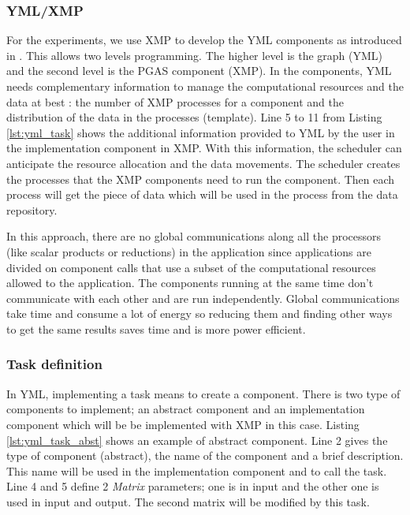 \subsubsection{YML/XMP}
For the experiments, we use XMP to develop the YML components as introduced in \cite{TsSHP2013}.
This allows two levels programming.
The higher level is the graph (YML) and the second level is the PGAS component (XMP).
In the components, YML needs complementary information to manage the computational resources and the data at best : the number of XMP processes for a component and the distribution of the data in the processes (template).
Line 5 to 11 from Listing \ref{lst:yml_task} shows the additional information provided to YML by the user in the implementation component in XMP.
With this information, the scheduler can anticipate the resource allocation and the data movements.
The scheduler creates the processes that the XMP components need to run the component.
Then each process will get the piece of data which will be used in the process from the data repository.

\begin{figure}[t]

\end{figure}

In this approach, there are no global communications along all the processors (like scalar products or reductions) in the application since applications are divided on component calls that use a subset of the computational resources allowed to the application.
The components running at the same time don't communicate with each other and are run independently.
Global communications take time and consume a lot of energy so reducing them and finding other ways to get the same results saves time and is more power efficient.

\begin{figure}

\end{figure}

\subsubsection{Task definition}
In YML, implementing a task means to create a component.
There is two type of components to implement; an abstract component and an implementation component which will be be implemented with XMP in this case.
Listing \ref{lst:yml_task_abst} shows an example of abstract component.
Line 2 gives the type of component (abstract), the name of the component and a brief description.
This name will be used in the implementation component and to call the task.
Line 4 and 5 define 2 \textit{Matrix} parameters; one is in input and the other one is used in input and output.
The second matrix will be modified by this task.


